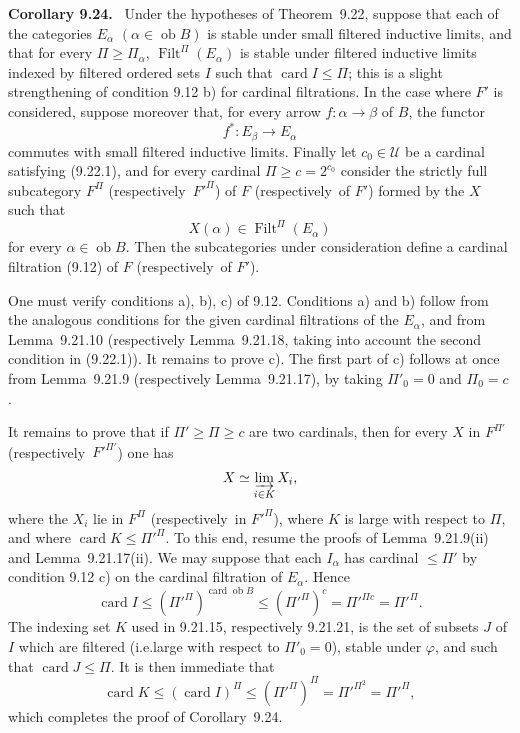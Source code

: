 \documentclass[11pt]{article}
\newcommand{\U}{\mathcal{U}}
\newcommand{\ob}{\operatorname{ob}}
\newcommand{\Filt}{\operatorname{Filt}}
\newcommand{\card}{\operatorname{card}}
\newcommand{\ie}{i.e.}
\newcommand{\resp}{respectively\ }
\newenvironment{statement}[1]{\par\medskip\noindent\textbf{#1.}\ }{\par\medskip}
\begin{document}
\begin{statement}{Corollary 9.24}
Under the hypotheses of Theorem~9.22, suppose that each of the categories $E_\alpha$ $(\alpha\in\ob B)$ is stable under small filtered inductive limits, and that for every $\Pi\geq\Pi_\alpha$, $\Filt^\Pi(E_\alpha)$ is stable under filtered inductive limits indexed by filtered ordered sets $I$ such that $\card I\leq\Pi$; this is a slight strengthening of condition 9.12 b) for cardinal filtrations. In the case where $F'$ is considered, suppose moreover that, for every arrow $f:\alpha\to\beta$ of $B$, the functor
\[
 f^\ast:E_\beta\to E_\alpha
\]
commutes with small filtered inductive limits. Finally let $c_0\in\U$ be a cardinal satisfying (9.22.1), and for every cardinal $\Pi\geq c=2^{c_0}$ consider the strictly full subcategory $F^\Pi$ (\resp ${F'}^\Pi$) of $F$ (\resp of $F'$) formed by the $X$ such that
\[
 X(\alpha)\in \Filt^\Pi(E_\alpha)
\]
for every $\alpha\in\ob B$. Then the subcategories under consideration define a cardinal filtration (9.12) of $F$ (\resp of $F'$).
\end{statement}

One must verify conditions a), b), c) of 9.12. Conditions a) and b) follow from the analogous conditions for the given cardinal filtrations of the $E_\alpha$, and from Lemma~9.21.10 (respectively Lemma~9.21.18, taking into account the second condition in (9.22.1)). It remains to prove c). The first part of c) follows at once from Lemma~9.21.9 (respectively Lemma~9.21.17), by taking $\Pi'_0=0$ and $\Pi_0=c$.

It remains to prove that if $\Pi'\geq\Pi\geq c$ are two cardinals, then for every $X$ in $F^{\Pi'}$ (\resp ${F'}^{\Pi'}$) one has
\[
 X\simeq\varinjlim_{i\in K}X_i,
\]
where the $X_i$ lie in $F^\Pi$ (\resp in ${F'}^\Pi$), where $K$ is large with respect to $\Pi$, and where $\card K\leq{\Pi'}^\Pi$. To this end, resume the proofs of Lemma~9.21.9(ii) and Lemma~9.21.17(ii). We may suppose that each $I_\alpha$ has cardinal $\leq\Pi'$ by condition 9.12 c) on the cardinal filtration of $E_\alpha$. Hence
\[
 \card I\leq ({\Pi'}^\Pi)^{\card\ob B}\leq
 ({\Pi'}^\Pi)^c={\Pi'}^{\Pi c}={\Pi'}^\Pi.
\]
The indexing set $K$ used in 9.21.15, respectively 9.21.21, is the set of subsets $J$ of $I$ which are filtered (\ie large with respect to $\Pi'_0=0$), stable under $\varphi$, and such that $\card J\leq\Pi$. It is then immediate that
\[
 \card K\leq(\card I)^\Pi\leq({\Pi'}^\Pi)^\Pi
   ={\Pi'}^{\Pi^2}={\Pi'}^\Pi,
\]
which completes the proof of Corollary~9.24.
\end{document}
